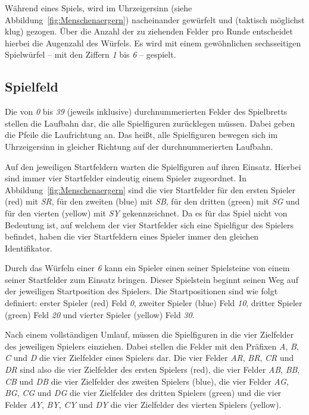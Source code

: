 Während eines Spiels, wird im Uhrzeigersinn (siehe Abbildung~\ref{fig:Menschenaergern}) nacheinander gewürfelt und (taktisch möglichst klug) gezogen. Über die Anzahl der zu ziehenden Felder pro Runde entscheidet hierbei die Augenzahl des Würfels. Es wird mit einem gewöhnlichen sechsseitigen Spielwürfel -- mit den Ziffern \emph{1} bis \emph{6} -- gespielt.

\subsection*{Spielfeld}
Die von \emph{0} bis \emph{39} (jeweils inklusive) durchnummerierten Felder des Spielbretts stellen die Laufbahn dar, die alle Spielfiguren zurücklegen müssen. Dabei geben die Pfeile die Laufrichtung an. Das heißt, alle Spielfiguren bewegen sich im Uhrzeigersinn in gleicher Richtung auf der durchnummerierten Laufbahn.

Auf den jeweiligen Startfeldern warten die Spielfiguren auf ihren Einsatz. Hierbei sind immer vier Startfelder eindeutig einem Spieler zugeordnet. In Abbildung~\ref{fig:Menschenaergern} sind die vier Startfelder für den ersten Spieler (red) mit \emph{SR}, für den zweiten (blue) mit \emph{SB}, für den dritten (green) mit \emph{SG} und für den vierten (yellow) mit \emph{SY} gekennzeichnet. Da es für das Spiel nicht von Bedeutung ist, auf welchem der vier Startfelder sich eine Spielfigur des Spielers befindet, haben die vier Startfeldern eines Spieler immer den gleichen Identifikator.

Durch das Würfeln einer \emph{6} kann ein Spieler einen seiner Spielsteine von einem seiner Startfelder zum Einsatz bringen. Dieser Spielstein beginnt seinen Weg auf der jeweiligen Startposition des Spielers. Die Startpositionen sind wie folgt definiert: erster Spieler (red) Feld \emph{0}, zweiter Spieler (blue) Feld \emph{10}, dritter Spieler (green) Feld \emph{20} und vierter Spieler (yellow) Feld \emph{30}. 

Nach einem vollständigen Umlauf, müssen die Spielfiguren in die vier Zielfelder des jeweiligen Spielers einziehen. Dabei stellen die Felder mit den Präfixen \emph{A}, \emph{B}, \emph{C} und \emph{D} die vier Zielfelder eines Spielers dar. Die vier Felder \emph{AR}, \emph{BR}, \emph{CR} und \emph{DR} sind also die vier Zielfelder des ersten Spielers (red), die vier Felder \emph{AB}, \emph{BB}, \emph{CB} und \emph{DB} die vier Zielfelder des zweiten Spielers (blue), die vier Felder \emph{AG}, \emph{BG}, \emph{CG} und \emph{DG} die vier Zielfelder des dritten Spielers (green) und die vier Felder \emph{AY}, \emph{BY}, \emph{CY} und \emph{DY} die vier Zielfelder des vierten Spielers (yellow).

